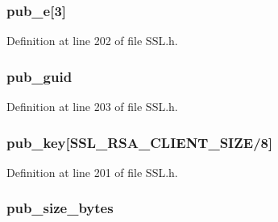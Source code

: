 \subsubsection[{pub\+\_\+e}]{ pub\+\_\+e\mbox{[}3\mbox{]}}\label{struct_s_s_l___p_k_e_y___i_n_f_o_abbbd47d9225209be9b36104fba835f3f}


Definition at line 202 of file S\+S\+L.\+h.

\hypertarget{struct_s_s_l___p_k_e_y___i_n_f_o_a648142c984b76eddbad388a1275956d2}{}
\subsubsection[{pub\+\_\+guid}]{ pub\+\_\+guid}\label{struct_s_s_l___p_k_e_y___i_n_f_o_a648142c984b76eddbad388a1275956d2}


Definition at line 203 of file S\+S\+L.\+h.

\hypertarget{struct_s_s_l___p_k_e_y___i_n_f_o_a3bfdbc645929212c40236e6652e139dc}{}
\subsubsection[{pub\+\_\+key}]{ pub\+\_\+key\mbox{[}{\bf S\+S\+L\+\_\+\+R\+S\+A\+\_\+\+C\+L\+I\+E\+N\+T\+\_\+\+S\+I\+Z\+E}/8\mbox{]}}\label{struct_s_s_l___p_k_e_y___i_n_f_o_a3bfdbc645929212c40236e6652e139dc}


Definition at line 201 of file S\+S\+L.\+h.

\hypertarget{struct_s_s_l___p_k_e_y___i_n_f_o_aa836f00b86e5af09e5ab2362794d787c}{}
\subsubsection[{pub\+\_\+size\+\_\+bytes}]{ pub\+\_\+size\+\_\+bytes}\label{struct_s_s_l___p_k_e_y___i_n_f_o_aa836f00b86e5af09e5ab2362794d787c}


